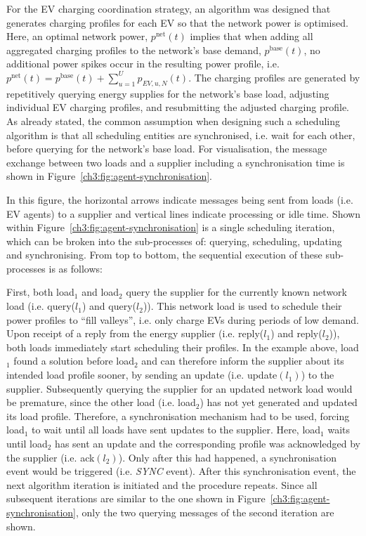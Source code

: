 For the EV charging coordination strategy, an algorithm was designed that generates charging profiles for each EV so that the network power is optimised.
Here, an optimal network power, $p^\text{net}(t)$ implies that when adding all aggregated charging profiles to the network's base demand, $p^\text{base}(t)$, no additional power spikes occur in the resulting power profile, i.e. $p^\text{net}(t) = p^\text{base}(t) + \sum_{u=1}^U p_{EV,u,N}(t)$.
The charging profiles are generated by repetitively querying energy supplies for the network's base load, adjusting individual EV charging profiles, and resubmitting the adjusted charging profile.
As already stated, the common assumption when designing such a scheduling algorithm is that all scheduling entities are synchronised, i.e. wait for each other, before querying for the network's base load.
For visualisation, the message exchange between two loads and a supplier including a synchronisation time is shown in Figure~\ref{ch3:fig:agent-synchronisation}.



In this figure, the horizontal arrows indicate messages being sent from loads (i.e. EV agents) to a supplier and vertical lines indicate processing or idle time.
Shown within Figure~\ref{ch3:fig:agent-synchronisation} is a single scheduling iteration, which can be broken into the sub-processes of: querying, scheduling, updating and synchronising.
From top to bottom, the sequential execution of these sub-processes is as follows:

First, both load$_1$ and load$_2$ query the supplier for the currently known network load (i.e. query($l_1$) and query($l_2$)).
This network load is used to schedule their power profiles to ``fill valleys'', i.e. only charge EVs during periods of low demand.
Upon receipt of a reply from the energy supplier (i.e. reply($l_1$) and reply($l_2$)), both loads immediately start scheduling their profiles.
In the example above, load$_1$ found a solution before load$_2$ and can therefore inform the supplier about its intended load profile sooner, by sending an update (i.e. update$(l_1)$) to the supplier.
Subsequently querying the supplier for an updated network load would be premature, since the other load (i.e. load$_2$) has not yet generated and updated its load profile.
Therefore, a synchronisation mechanism had to be used, forcing load$_1$ to wait until all loads have sent updates to the supplier.
Here, load$_1$ waits until load$_2$ has sent an update and the corresponding profile was acknowledged by the supplier (i.e. ack$(l_2)$).
Only after this had happened, a synchronisation event would be triggered (i.e. \textit{SYNC} event).
After this synchronisation event, the next algorithm iteration is initiated and the procedure repeats.
Since all subsequent iterations are similar to the one shown in Figure~\ref{ch3:fig:agent-synchronisation}, only the two querying messages of the  second iteration are shown.

